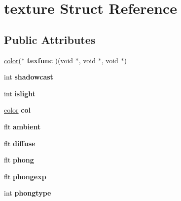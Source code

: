 \hypertarget{structtexture}{}\section{texture Struct Reference}
\label{structtexture}
\subsection*{Public Attributes}
\begin{DoxyCompactItemize}
\item 
\hypertarget{structtexture_a0bdad441039ad0aacca047f9343caea7}{}\hyperlink{structcolor}{color}($\ast$ {\bfseries texfunc} )(void $\ast$, void $\ast$, void $\ast$)\label{structtexture_a0bdad441039ad0aacca047f9343caea7}

\item 
\hypertarget{structtexture_a96d59c72cd66d6567ea0a45f592e2bd9}{}int {\bfseries shadowcast}\label{structtexture_a96d59c72cd66d6567ea0a45f592e2bd9}

\item 
\hypertarget{structtexture_a0a01298a327b65af2131b34208ff40cb}{}int {\bfseries islight}\label{structtexture_a0a01298a327b65af2131b34208ff40cb}

\item 
\hypertarget{structtexture_a52a163c6d953b2d2e08454ba05df3593}{}\hyperlink{structcolor}{color} {\bfseries col}\label{structtexture_a52a163c6d953b2d2e08454ba05df3593}

\item 
\hypertarget{structtexture_a19ac6224452071a59b29c4570400522b}{}flt {\bfseries ambient}\label{structtexture_a19ac6224452071a59b29c4570400522b}

\item 
\hypertarget{structtexture_aa8697f54cb0ff3977801a7b3319f0462}{}flt {\bfseries diffuse}\label{structtexture_aa8697f54cb0ff3977801a7b3319f0462}

\item 
\hypertarget{structtexture_a0c6db19eb853e330ec81b6f19a094959}{}flt {\bfseries phong}\label{structtexture_a0c6db19eb853e330ec81b6f19a094959}

\item 
\hypertarget{structtexture_a690be02b0cc2ba5e4c1b8a8304300b5b}{}flt {\bfseries phongexp}\label{structtexture_a690be02b0cc2ba5e4c1b8a8304300b5b}

\item 
\hypertarget{structtexture_aecfe300c7428d5d5b8146143341d3b20}{}int {\bfseries phongtype}\label{structtexture_aecfe300c7428d5d5b8146143341d3b20}


\end{DoxyCompactItemize}
